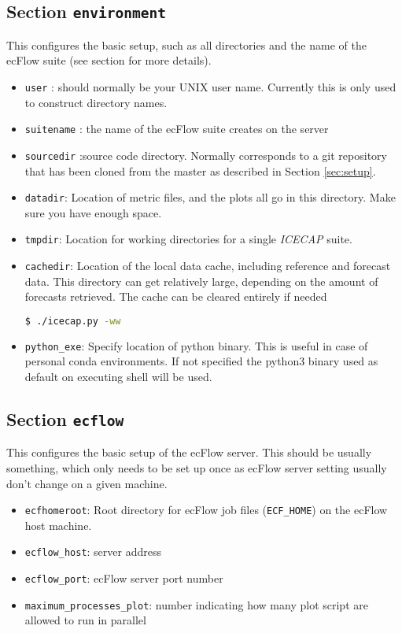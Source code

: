 \documentclass[DIV=10, parskip=full]{scrreprt}
\newcommand{\ice}{\textit{ICECAP}\xspace}
\begin{document}
\subsection{Section \texttt{environment}} \label{sec:environment}
This configures the basic setup, such as all directories and the name of the ecFlow suite (see section \label{sec:eflow} for more details).
\begin{itemize}
	\item \texttt{user} : should normally be your UNIX user name. Currently this is only used to construct directory names.
	\item \texttt{suitename} : the name of the ecFlow suite creates on the server 
	\item \texttt{sourcedir} :source code directory. Normally corresponds to a git repository that has been cloned from the master as described in Section \ref{sec:setup}.
	 \item \texttt{datadir}: Location of metric files, and the plots all go in this directory. Make sure you have enough space. 
	  \item \texttt{tmpdir}: Location for working directories for a single \ice suite.
	   \item \texttt{cachedir}: Location of the local data cache, including reference and forecast data. This directory can get relatively large, depending on the amount of forecasts retrieved. The cache can be cleared entirely if needed 
	   \begin{lstlisting}[language=bash]
	   	$ ./icecap.py -ww
	   \end{lstlisting}
	   \item \texttt{python\_exe}: Specify location of python binary. This is useful in case of personal conda environments. If not specified the python3 binary used as default on executing shell will be used.
\end{itemize}
	
\subsection{Section \texttt{ecflow}} \label{sec:ecflow}
This configures the basic setup of the ecFlow server. This should be usually something, which only needs to be set up once as ecFlow server setting usually don't change on a given machine.
\begin{itemize}
 	\item \texttt{ecfhomeroot}: Root directory for ecFlow job files (\texttt{ECF\_HOME}) on the ecFlow host machine.
 	\item \texttt{ecflow\_host}: server address
 	\item \texttt{ecflow\_port}: ecFlow server port number
 	\item \texttt{maximum\_processes\_plot}: number indicating how many plot script are allowed to run in parallel
 \end{itemize}
 
\end{document}
